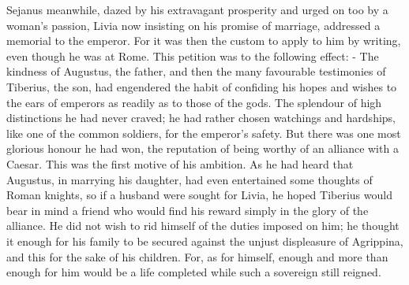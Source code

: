 
Sejanus meanwhile, dazed by his extravagant prosperity and urged on too by a woman's passion, Livia now insisting on his promise of marriage, addressed a memorial to the emperor. For it was then the custom to apply to him by writing, even though he was at Rome. This petition was to the following effect: - The kindness of Augustus, the father, and then the many favourable testimonies of Tiberius, the son, had engendered the habit of confiding his hopes and wishes to the ears of emperors as readily as to those of the gods. The splendour of high distinctions he had never craved; he had rather chosen watchings and hardships, like one of the common soldiers, for the emperor's safety. But there was one most glorious honour he had won, the reputation of being worthy of an alliance with a Caesar. This was the first motive of his ambition. As he had heard that Augustus, in marrying his daughter, had even entertained some thoughts of Roman knights, so if a husband were sought for Livia, he hoped Tiberius would bear in mind a friend who would find his reward simply in the glory of the alliance. He did not wish to rid himself of the duties imposed on him; he thought it enough for his family to be secured against the unjust displeasure of Agrippina, and this for the sake of his children. For, as for himself, enough and more than enough for him would be a life completed while such a sovereign still reigned.



